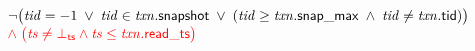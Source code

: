
\begin{algorithm}[H]
  \begin{algorithmic}[1]
    \Procedure{\txnvis}{$\txnvar, \tidvar, \red{\tsvar}$}
      \State \Return
          $\lnot \big(\mathit{tid} = -1 \;\lor\;
		    \mathit{tid} \in \mathit{txn}.{\sf snapshot} \;\lor\;
			(\mathit{tid} \ge \mathit{txn}.{\sf snap\_max} \;\land\; \mathit{tid} \neq \mathit{txn}.{\sf tid})\big)$
          $\textcolor{red}{\land\; \big(\mathit{ts} \neq \bot_{{\sf ts}} \land \mathit{ts} \le \mathit{txn}.{\sf read\_ts}\big)}$
    \EndProcedure
  \end{algorithmic}
\end{algorithm}